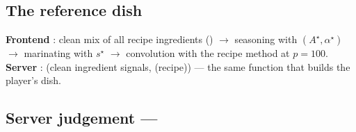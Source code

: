 \documentclass[11pt,a4paper]{article}
\begin{document}
\subsection{The reference dish}
\textbf{Frontend} : clean mix of all recipe ingredients
() $\rightarrow$ seasoning with $(A^\star,\alpha^\star)$ $\rightarrow$
marinating with $s^\star$ $\rightarrow$ convolution with the recipe method at $p=100$.
\textbf{Server} : (clean ingredient signals,
(recipe)) --- the same function that builds the player's dish.

\subsection{Server judgement --- }
\end{document}
